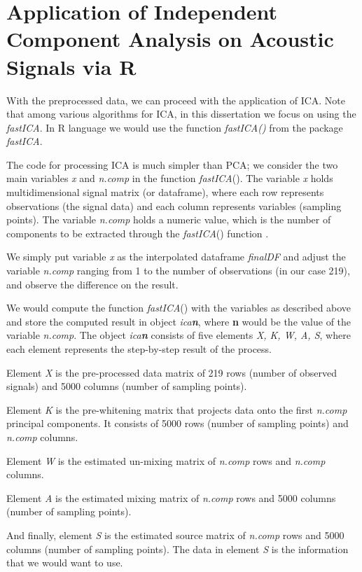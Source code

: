 \section{Application of Independent Component Analysis on Acoustic Signals via R}   


With the preprocessed data, we can proceed with the application of ICA. Note that among various algorithms for ICA, in this dissertation we focus on using the \emph{fastICA}. In R language we would use the function \emph{fastICA()} from the package \emph{fastICA}.

The code for processing ICA is much simpler than PCA; we consider the two main variables \emph{x} and \emph{n.comp} in the function \emph{fastICA}(). The variable \emph{x} holds multidimensional signal matrix (or dataframe), where each row represents observations (the signal data) and each column represents variables (sampling points). The variable \emph{n.comp} holds a numeric value, which is the number of components to be extracted through the \emph{fastICA}() function \cite{fastICACranR}. 

We simply put variable \emph{x} as the interpolated dataframe \emph{finalDF} and adjust the variable \emph{n.comp} ranging from 1 to the number of observations (in our case 219), and observe the difference on the result.

We would compute the function \emph{fastICA}() with the variables as described above and store the computed result in object \emph{ica\textbf{n}}, where \textbf{n} would be the value of the variable \emph{n.comp}. The object \emph{ica\textbf{n}} consists of five elements \emph{X, K, W, A, S}, where each element represents the step-by-step result of the process. 

Element \emph{X} is the pre-processed data matrix of 219 rows (number of observed signals) and 5000 columns (number of sampling points). 

Element \emph{K} is the pre-whitening matrix that projects data onto the first \emph{n.comp} principal components. It consists of 5000 rows (number of sampling points) and \emph{n.comp} columns.

Element \emph{W} is the estimated un-mixing matrix of \emph{n.comp} rows and \emph{n.comp} columns.

Element \emph{A} is the estimated mixing matrix of \emph{n.comp} rows and 5000 columns (number of sampling points).

And finally, element \emph{S} is the estimated source matrix of \emph{n.comp} rows and 5000 columns (number of sampling points). The data in element \emph{S} is the information that we would want to use. 


